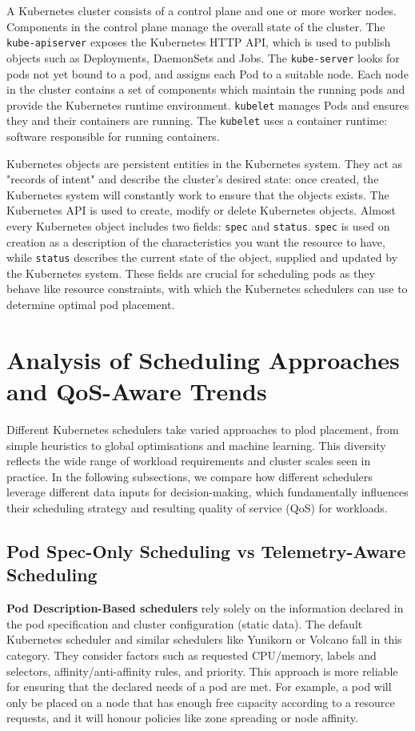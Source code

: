 A Kubernetes cluster consists of a control plane and one or more worker nodes.
Components in the control plane manage the overall state of the cluster. The
\verb|kube-apiserver| exposes the Kubernetes HTTP API, which is used to publish
objects such as Deployments, DaemonSets and Jobs. The \verb|kube-server| looks
for pods not yet bound to a pod, and assigns each Pod to a suitable node. Each
node in the cluster contains a set of components which maintain the running pods
and provide the Kubernetes runtime environment. \verb|kubelet| manages Pods and
ensures they and their containers are running. The \verb|kubelet| uses a
container runtime: software responsible for running containers.

Kubernetes objects are persistent entities in the Kubernetes system. They act as
"records of intent" and describe the cluster's desired state: once created, the
Kubernetes system will constantly work to ensure that the objects exists. The
Kubernetes API is used to create, modify or delete Kubernetes objects. Almost
every Kubernetes object includes two fields: \verb|spec| and \verb|status|.
\verb|spec| is used on creation as a description of the characteristics you want
the resource to have, while \verb|status| describes the current state of the
object, supplied and updated by the Kubernetes system. These fields are crucial
for scheduling pods as they behave like resource constraints, with which the
Kubernetes schedulers can use to determine optimal pod placement.

\section{Analysis of Scheduling Approaches and QoS-Aware Trends}
Different Kubernetes schedulers take varied approaches to plod placement, from
simple heuristics to global optimisations and machine learning. This diversity
reflects the wide range of workload requirements and cluster scales seen in
practice. In the following subsections, we compare how different schedulers
leverage different data inputs for decision-making, which fundamentally
influences their scheduling strategy and resulting quality of service (QoS) for
workloads.

\subsection{Pod Spec-Only Scheduling vs Telemetry-Aware Scheduling}

\textbf{Pod Description-Based schedulers} rely solely on the information declared
in the pod specification and cluster configuration (static data). The default
Kubernetes scheduler \cite{} and similar schedulers like Yunikorn or Volcano
\cite{} fall in this category. They consider factors such as requested
CPU/memory, labels and selectors, affinity/anti-affinity rules, and priority.
This approach is more reliable for ensuring that the declared needs of a pod are
met. For example, a pod will only be placed on a node that has enough free
capacity according to a resource requests, and it will honour policies like zone
spreading or node affinity.

